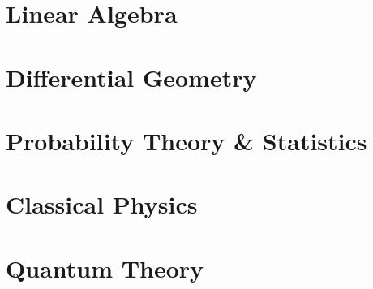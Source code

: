 \documentclass[12pt, a4paper]{report}
\begin{document}
\part{Linear Algebra}








\part{Differential Geometry}\label{part:diffgeom}
















\part{Probability Theory \& Statistics}









\part{Classical Physics}





\part{Quantum Theory}






\end{document}
